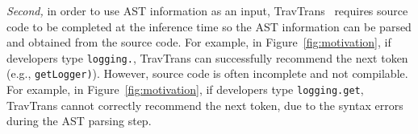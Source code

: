











\emph{Second,} in order to use AST information as an input, TravTrans~\cite{kim2021code} requires source code to be completed at the inference time so the AST information can be parsed and obtained from the source code. 
For example, in Figure~\ref{fig:motivation}, if developers type \texttt{logging.}, TravTrans can successfully recommend the next token (e.g., \texttt{getLogger)}).
However, source code is often incomplete and not compilable.
For example, in Figure~\ref{fig:motivation}, if developers type \texttt{logging.get}, TravTrans cannot correctly recommend the next token, due to the syntax errors during the AST parsing step.


